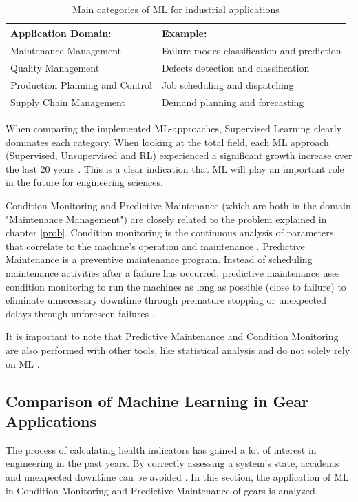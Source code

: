 \begin{table}
	\begin{center}
		\begin{tabular}{|| l | l ||}
			\hline
			\rule{0pt}{2ex}Application Domain: & Example:\\
			\hline
			\hline
			\rule{0pt}{2ex}Maintenance Management & Failure modes classification and prediction\\\hline
			Quality Management & Defects detection and classification\\	\hline
			Production Planning and Control & Job scheduling and dispatching\\\hline
			Supply Chain Management & Demand planning and forecasting\\
			\hline
		\end{tabular}
		\caption{Main categories of ML for industrial applications \cite{Bertolini}}
		\label{MLIND}
	\end{center}
	\vspace{-4mm}
\end{table}
When comparing the implemented ML-approaches, Supervised Learning clearly dominates each category. When looking at the total field, each ML approach (Supervised, Unsupervised and RL) experienced a significant growth increase over the last 20 years \cite{Bertolini}. This is a clear indication that ML will play an important role in the future for engineering sciences.

Condition Monitoring and Predictive Maintenance (which are both in the domain "Maintenance Management") are closely related to the problem explained in chapter \ref{prob}.
Condition monitoring is the continuous analysis of parameters that correlate to the machine's operation and maintenance \cite{Rao}. Predictive Maintenance is a preventive maintenance program. Instead of scheduling maintenance activities after a failure has occurred, predictive maintenance uses condition monitoring to run the machines as long as possible (close to failure) to eliminate unnecessary downtime through premature stopping or unexpected delays through unforeseen failures \cite{Mobley}.

It is important to note that Predictive Maintenance and Condition Monitoring are also performed with other tools, like statistical analysis and do not solely rely on ML \cite{Carvalho, Divya}. 


 
\subsection{Comparison of Machine Learning in Gear Applications}
The process of calculating health indicators has gained a lot of interest in engineering in the past years. By correctly assessing a system's state, accidents and unexpected downtime can be avoided \cite{Wang}. In this section, the application of ML in Condition Monitoring and Predictive Maintenance of gears is analyzed.

